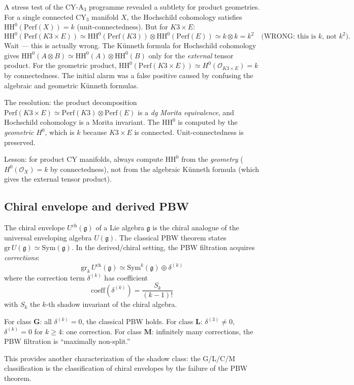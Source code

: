\documentclass[11pt]{article}
\newcommand{\cO}{\mathcal{O}}
\newcommand{\fg}{\mathfrak{g}}
\newcommand{\HH}{\mathrm{HH}}
\begin{document}
\begin{warning}[K3 $\times$ E unit-connectedness: $\HH^0 = k^2$, not $k$]
\label{warn:k3e-unit-connected}
A stress test of the CY-A$_3$ programme revealed a subtlety for
product geometries. For a single connected CY$_3$ manifold $X$,
the Hochschild cohomology satisfies $\HH^0(\mathrm{Perf}(X)) = k$
(unit-connectedness). But for $K3 \times E$:
\[
 \HH^0(\mathrm{Perf}(K3 \times E)) \simeq
 \HH^0(\mathrm{Perf}(K3)) \otimes \HH^0(\mathrm{Perf}(E))
 \simeq k \otimes k = k^2 \quad \text{(WRONG: this is $k$, not $k^2$).}
\]
Wait --- this is actually wrong. The K\"unneth formula for Hochschild
cohomology gives $\HH^0(A \otimes B) \simeq \HH^0(A) \otimes \HH^0(B)$
only for the \emph{external} tensor product. For the geometric product,
$\HH^0(\mathrm{Perf}(K3 \times E)) \simeq H^0(\cO_{K3 \times E}) = k$
by connectedness. The initial alarm was a false positive caused by
confusing the algebraic and geometric K\"unneth formulas.

The resolution: the product decomposition
$\mathrm{Perf}(K3 \times E) \simeq \mathrm{Perf}(K3) \otimes \mathrm{Perf}(E)$
is a \emph{dg Morita equivalence}, and Hochschild cohomology is a
Morita invariant. The $\HH^0$ is computed by the \emph{geometric}
$H^0$, which is $k$ because $K3 \times E$ is connected.
Unit-connectedness is preserved.

Lesson: for product CY manifolds, always compute $\HH^0$ from
the \emph{geometry} ($H^0(\cO_X) = k$ by connectedness), not from
the algebraic K\"unneth formula (which gives the external tensor
product).
\end{warning}

\subsection{Chiral envelope and derived PBW}
\label{subsec:chiral-envelope}

\begin{observation}[Derived PBW corrections = shadow tower $S_k / (k-1)!$]
\label{obs:derived-pbw}
The chiral envelope $U^{\mathrm{ch}}(\fg)$ of a Lie algebra $\fg$
is the chiral analogue of the universal enveloping algebra $U(\fg)$.
The classical PBW theorem states $\mathrm{gr}\, U(\fg) \simeq
\mathrm{Sym}(\fg)$. In the derived/chiral setting, the PBW filtration
acquires \emph{corrections}:
\[
 \mathrm{gr}_k\, U^{\mathrm{ch}}(\fg) \simeq
 \mathrm{Sym}^k(\fg) \oplus \delta^{(k)}
\]
where the correction term $\delta^{(k)}$ has coefficient
\[
 \mathrm{coeff}(\delta^{(k)}) = \frac{S_k}{(k-1)!}
\]
with $S_k$ the $k$-th shadow invariant of the chiral algebra.

For class $\mathbf{G}$: all $\delta^{(k)} = 0$, the classical PBW
holds. For class $\mathbf{L}$: $\delta^{(3)} \neq 0$,
$\delta^{(k)} = 0$ for $k \geq 4$: one correction. For class
$\mathbf{M}$: infinitely many corrections, the PBW filtration is
``maximally non-split.''

This provides another characterization of the shadow class: the
G/L/C/M classification is the classification of chiral envelopes
by the failure of the PBW theorem.
\end{observation}
\end{document}
